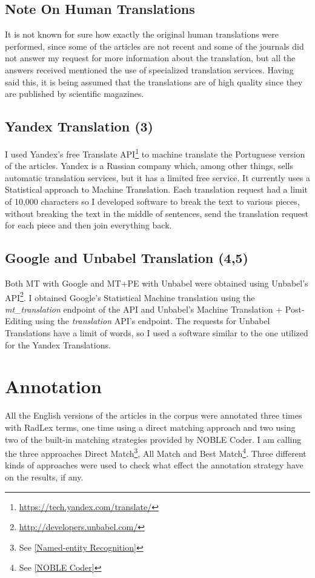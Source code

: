 \subsection{Note On Human Translations}

It is not known for sure how exactly the original human translations were performed, since some of the articles are not recent and some of the journals did not answer my request for more information about the translation, but all the answers received mentioned the use of specialized translation services. Having said this, it is being assumed that the translations are of high quality since they are published by scientific magazines. 

\subsection{Yandex Translation (3)}

I used Yandex's free Translate API\footnote{\url{https://tech.yandex.com/translate/}} to machine translate the Portuguese version of the articles. Yandex is a Russian company which, among other things, sells automatic translation services, but it has a limited free service. It currently uses a Statistical approach to Machine Translation. Each translation request had a limit of 10,000 characters so I developed software to break the text to various pieces, without breaking the text in the middle of sentences, send the translation request for each piece and then join everything back. 

\subsection{Google and Unbabel Translation (4,5)}

Both MT with Google and MT+PE with Unbabel were obtained using Unbabel's API\footnote{\url{http://developers.unbabel.com/}}. I obtained Google’s Statistical Machine translation using the \textit{mt\_translation} endpoint of the API and Unbabel’s Machine Translation + Post-Editing using the \textit{translation} API’s endpoint.  The requests for Unbabel Translations have a limit of words, so I used a software similar to the one utilized for the Yandex Translations. 

\section{Annotation}

All the English versions of the articles in the corpus were annotated three times with RadLex terms, one time using a direct matching approach and two using two of the built-in matching strategies provided by NOBLE Coder. I am calling the three approaches Direct Match\footnote{See \ref{Named-entity Recognition}}, All Match and Best Match\footnote{See \ref{NOBLE Coder}}. Three different kinds of approaches were used to check what effect the annotation strategy have on the results, if any.

